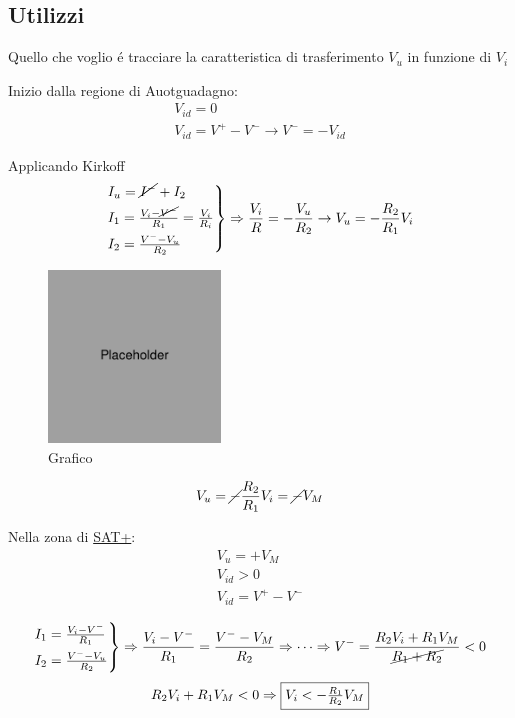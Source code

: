 \subsection{Utilizzi}
Quello che voglio \'e tracciare la caratteristica di trasferimento $V_u$ in funzione di $V_i$

Inizio dalla regione di Auotguadagno:
\[
    \begin{split}
        V_{id} = 0\\
        V_{id} = V^+ - V^- \rightarrow V^- = -V_{id}
    \end{split}
\]

Applicando Kirkoff
\[
    \begin{rcases}
    I_u = \cancel{I^-} + I_2\\
    I_1 = \frac{V_i - \cancel{V^-} }{R_1} = \frac{V_i}{R_i}\\
    I_2 = \frac{V^- - V_u}{R_2}
    \end{rcases}
    \Rightarrow \frac{V_i}{R} = -\frac{V_u}{R_2} \rightarrow V_u = - \frac{R_2}{R_1}V_i
\]

\begin{figure}[H]
    \centering
    \includegraphics[width=1.8in]{placeholder.jpg}
    \caption{Grafico}
\end{figure}
\[
    V_u = \cancel{-}\frac{R_2}{R_1} V_i = \cancel{-}V_M
\]

Nella zona di \underline{SAT+}:
\[
    \begin{split}
    V_u = +V_M\\
    V_{id} > 0 \\
    V_{id} = V^+ - V^-
    \end{split}
\]

\[
    \begin{rcases}
        I_1 = \frac{V_i - V^-}{R_1}\\
        I_2 = \frac{V^- - V_u}{R_2}
    \end{rcases} \Rightarrow \frac{V_i - V^-}{R_1} = \frac{V^- - V_M}{R_2} \Rightarrow \cdots \Rightarrow
V^- = \frac{R_2 V_i + R_1 V_M}{\cancel{R_1 + R_2}} < 0
\]
\[
    R_2 V_i + R_1 V_M < 0 \Rightarrow \framebox{$V_i < -\frac{R_1}{R_2} V_M$}
\]

